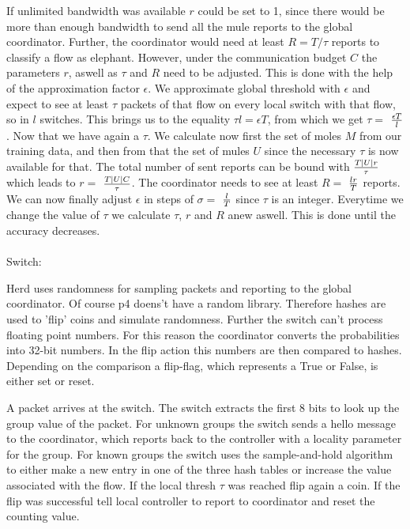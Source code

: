 \documentclass[11pt,oneside,a4paper]{article}
\begin{document}
If unlimited bandwidth was available $r$ could be set to 1, since there would be more than enough bandwidth to send all the mule reports to the global coordinator. Further, the coordinator would need at least $R = T/\tau$ reports to classify a flow as elephant. However, under the communication budget $C$ the parameters $r$, aswell as $\tau$ and $R$ need to be adjusted. This is done with the help of the approximation factor $\epsilon$. We approximate global threshold with $\epsilon$ and expect to see at least $\tau$ packets of that flow on every local switch with that flow, so in $l$ switches. This brings us to the equality $\tau l = \epsilon T$, from which we get $\tau =$ $\epsilon T\over l$. Now that we have again a $\tau$. We calculate now first the set of moles $M$ from our training data, and then from that the set of mules $U$ since the necessary $\tau$ is now available for that. The total number of sent reports can be bound with $T|U|r\over \tau$ which leads to $r =$ $T|U|C\over \tau$. The coordinator needs to see at least $R =$ $lr\over T$ reports. We can now finally adjust $\epsilon$ in steps of $\sigma =$ $l\over T$ since $\tau$ is an integer. Everytime we change the value of $\tau$ we calculate $\tau$, $r$ and $R$ anew aswell. This is done until the accuracy decreases.\\\\


Switch:

Herd uses randomness for sampling packets and reporting to the global coordinator. Of course p4 doens't have a random library. Therefore hashes are used to 'flip' coins and simulate randomness. Further the switch can't process floating point numbers. For this reason the coordinator converts the probabilities into 32-bit numbers. In the flip action this numbers are then compared to hashes. Depending on the comparison a flip-flag, which represents a True or False, is either set or reset.

A packet arrives at the switch. The switch extracts the first 8 bits to look up the group value of the packet. For unknown groups the switch sends a hello message to the coordinator, which reports back to the controller with a locality parameter for the group. For known groups the switch uses the sample-and-hold algorithm to either make a new entry in one of the three hash tables or increase the value associated with the flow. If the local thresh $\tau$ was reached flip again a coin. If the flip was successful tell local controller to report to coordinator and reset the counting value. \\
\end{document}
